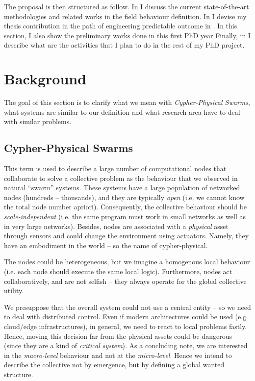 \documentclass[11pt]{article}
\begin{document}
The proposal is then structured as follow. In  I discuss the current state-of-the-art methodologies and related works in the field \cpsw{} behaviour definition.
%
In  I devise my thesis contribution in the path of engineering predictable outcome in \cpsw{}. In this section, I also show the preliminary works done in this first PhD year
%
Finally, in  I describe what are the activities that I plan to do in the rest of my PhD project.

\section{Background} \label{background}
The goal of this section is to clarify what we mean with \textit{Cypher-Physical Swarms}, what systems are similar to our definition and what research area have to deal with similar problems.
\subsection{Cypher-Physical Swarms}
This term is used to describe a large number of computational nodes that collaborate to solve a collective problem as the behaviour that we observed in natural ``swarm'' systems.
%
These systems have a large population of networked nodes (hundreds -- thousands), and they are typically \textit{open} (i.e. we cannot know the total node number apriori). Consequently, the collective behaviour should be \textit{scale-independent} (i.e. the same program must work in small networks as well as in very large networks).
%
Besides, nodes are associated with a \textit{physical} asset through sensors and could change the environment using actuators. Namely, they have an embodiment in the world -- so the name of cypher-physical. 

The nodes could be heterogeneous, but we imagine a homogenous local behaviour (i.e. each node should execute the same local logic). Furthermore, nodes act collaboratively, and are not selfish -- they always operate for the global collective utility.

We presuppose that the overall system could not use a central entity -- so we need to deal with distributed control. Even if modern architectures could be used (e.g cloud/edge infrastructures), in general, we need to react to local problems fastly. Hence, moving this decision far from the physical assets could be dangerous (since they are a kind of \emph{critical system}).
%
As a concluding note, we are interested in the \textit{macro-level} behaviour and not at the \textit{micro-level}. Hence we intend to describe the collective not by emergence, but by defining a global wanted structure.
\end{document}
